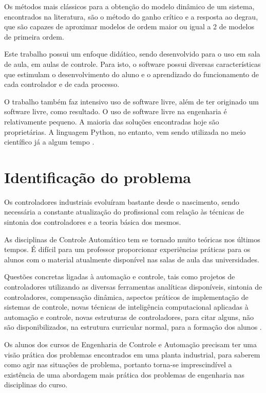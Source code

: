     Os métodos mais clássicos para a obtenção do modelo dinâmico de um sistema, encontrados
    na literatura, são o método do ganho crítico e a resposta ao degrau, que são capazes
    de aproximar modelos de ordem maior ou igual a 2 de modelos de primeira ordem.

    Este trabalho possui um enfoque didático, sendo desenvolvido para o uso em sala de aula,
    em aulas de controle. Para isto, o software possui diversas características que estimulam
    o desenvolvimento do aluno e o aprendizado do funcionamento de cada controlador e 
    de cada processo.

    O trabalho também faz intensivo uso de software livre, além de ter originado um software
    livre, como resultado. O uso de software livre na engenharia é relativamente pequeno.
    A maioria das soluções encontradas hoje são proprietárias. A linguagem Python, no entanto,
    vem sendo utilizada no meio científico já a algum tempo \cite{5725235}.


\section{Identificação do problema}
    
    Os controladores industriais evoluíram bastante desde o nascimento, sendo necessária
    a constante atualização do profissional com relação às técnicas de sintonia dos
    controladores e a teoria básica dos mesmos.

    As disciplinas de Controle Automático tem se tornado muito teóricas nos últimos
    tempos. É difícil para um professor proporcionar experiências práticas para os
    alunos com o material atualmente disponível nas salas de aula das universidades.
    
    Questões concretas ligadas à automação e controle, tais como projetos de
    controladores utilizando as diversas ferramentas analíticas disponíveis, sintonia de
    controladores, compensação dinâmica, aspectos práticos de implementação de sistemas de
    controle, novas técnicas de inteligência computacional aplicadas à automação e controle,
    novas estruturas de controladores, para citar alguns, não são disponibilizados, na estrutura
    curricular normal, para a formação dos alunos \cite{cobenge}.

    Os alunos dos cursos de Engenharia de Controle e Automação precisam ter uma
    visão prática dos problemas encontrados em uma planta industrial, para saberem
    como agir nas situações de problema, portanto torna-se imprescindível a existência
    de uma abordagem mais prática dos problemas de engenharia nas disciplinas do curso.

